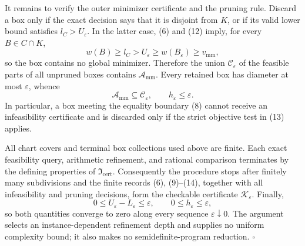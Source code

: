 It remains to verify the outer minimizer certificate and the pruning rule.  Discard a box only if the exact decision says that it is disjoint from \(K\), or if its valid lower bound satisfies \(l_C>U_\varepsilon\).  In the latter case, (6) and (12) imply, for every \(B\in C\cap K\),
\[
 w(B)\geq l_C>U_\varepsilon\geq w(B_\varepsilon)\geq v_{\mathrm{mm}}, \tag{13}
\]
so the box contains no global minimizer.  Therefore the union \(\mathcal C_\varepsilon\) of the feasible parts of all unpruned boxes contains \(\mathcal A_{\mathrm{mm}}\).  Every retained box has diameter at most \(\varepsilon\), whence
\[
 \mathcal A_{\mathrm{mm}}\subseteq\mathcal C_\varepsilon,
 \qquad h_\varepsilon\leq\varepsilon. \tag{14}
\]
In particular, a box meeting the equality boundary (8) cannot receive an infeasibility certificate and is discarded only if the strict objective test in (13) applies.

All chart covers and terminal box collections used above are finite.  Each exact feasibility query, arithmetic refinement, and rational comparison terminates by the defining properties of \(\mathfrak I_{\mathrm{cert}}\).  Consequently the procedure stops after finitely many subdivisions and the finite records (6), (9)--(14), together with all infeasibility and pruning decisions, form the checkable certificate \(\mathscr K_\varepsilon\).  Finally,
\[
 0\leq U_\varepsilon-L_\varepsilon\leq\varepsilon,
 \qquad 0\leq h_\varepsilon\leq\varepsilon,
\]
so both quantities converge to zero along every sequence \(\varepsilon\downarrow0\).  The argument selects an instance-dependent refinement depth and supplies no uniform complexity bound; it also makes no semidefinite-program reduction. \(\square\)
